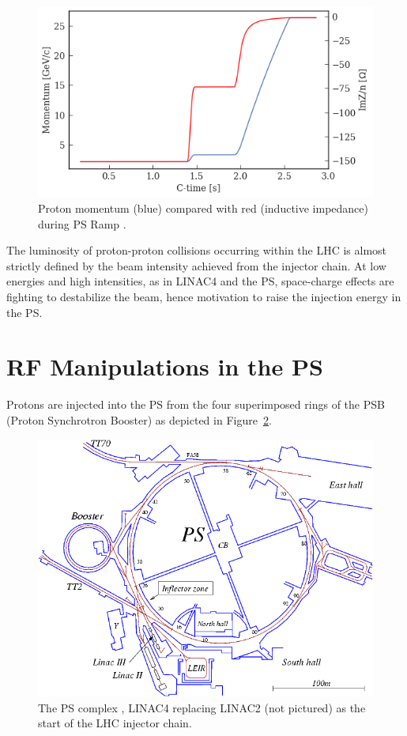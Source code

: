 \begin{figure}
    \centering
    \includegraphics{figs/energy_v_space_charge_impedance.png}
    \caption{Proton momentum (blue) compared with red (inductive impedance) during PS Ramp \cite{lasheen_alexandre_ps_2020}.}
    \label{fig:ps_impedance}
\end{figure}

The luminosity of proton-proton collisions occurring within the LHC is almost strictly defined by the beam intensity achieved from the injector chain. At low energies and high intensities, as in LINAC4 and the PS, space-charge effects are fighting to destabilize the beam, hence motivation to raise the injection energy in the PS.

\section{RF Manipulations in the PS}

Protons are injected into the PS from the four superimposed rings of the PSB (Proton Synchrotron Booster) as depicted in Figure~\ref{fig:ps_complex}.

\begin{figure}
    \centering
    \includegraphics{figs/pscomplex.png}
    \caption{The PS complex \cite{belleman_ps_2020}, LINAC4 replacing LINAC2 (not pictured) as the start of the LHC injector chain.}
    \label{fig:ps_complex}
\end{figure}

